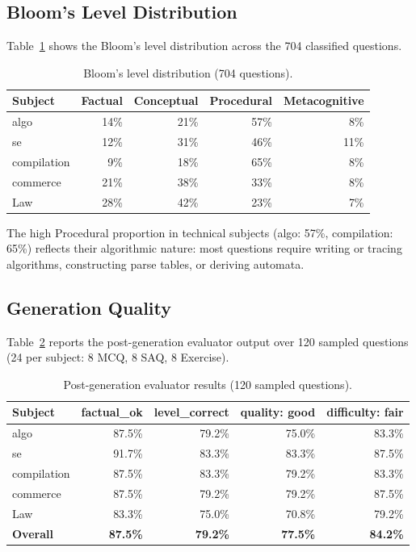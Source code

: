 \subsection{Bloom's Level Distribution}

Table~\ref{tab:bloom} shows the Bloom's level distribution across the 704 classified
questions.

\begin{table}[H]
\centering
\caption{Bloom's level distribution (704 questions).}
\label{tab:bloom}
\begin{tabular}{lrrrr}
\toprule
\textbf{Subject} & \textbf{Factual} & \textbf{Conceptual} & \textbf{Procedural}
  & \textbf{Metacognitive} \\
\midrule
algo        & 14\% & 21\% & 57\% &  8\% \\
se          & 12\% & 31\% & 46\% & 11\% \\
compilation &  9\% & 18\% & 65\% &  8\% \\
commerce    & 21\% & 38\% & 33\% &  8\% \\
Law         & 28\% & 42\% & 23\% &  7\% \\
\bottomrule
\end{tabular}
\end{table}

The high Procedural proportion in technical subjects (algo: 57\%, compilation: 65\%)
reflects their algorithmic nature: most questions require writing or tracing algorithms,
constructing parse tables, or deriving automata.

\subsection{Generation Quality}

Table~\ref{tab:eval} reports the post-generation evaluator output over 120 sampled
questions (24 per subject: 8 MCQ, 8 SAQ, 8 Exercise).

\begin{table}[H]
\centering
\caption{Post-generation evaluator results (120 sampled questions).}
\label{tab:eval}
\begin{tabular}{lrrrr}
\toprule
\textbf{Subject} & \textbf{factual\_ok} & \textbf{level\_correct}
  & \textbf{quality: good} & \textbf{difficulty: fair} \\
\midrule
algo        & 87.5\% & 79.2\% & 75.0\% & 83.3\% \\
se          & 91.7\% & 83.3\% & 83.3\% & 87.5\% \\
compilation & 87.5\% & 83.3\% & 79.2\% & 83.3\% \\
commerce    & 87.5\% & 79.2\% & 79.2\% & 87.5\% \\
Law         & 83.3\% & 75.0\% & 70.8\% & 79.2\% \\
\midrule
\textbf{Overall} & \textbf{87.5\%} & \textbf{79.2\%} & \textbf{77.5\%} & \textbf{84.2\%} \\
\bottomrule
\end{tabular}
\end{table}


